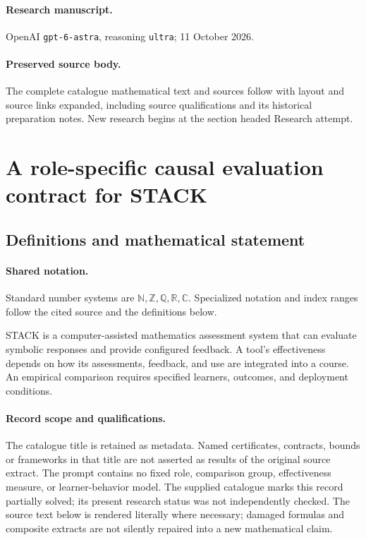 \documentclass[11pt]{article}
\begin{document}
\paragraph{Research manuscript.} OpenAI \texttt{gpt-6-astra}, reasoning \texttt{ultra}; 11 October 2026.
\paragraph{Preserved source body.} The complete catalogue mathematical text and sources follow with layout and source links expanded, including source qualifications and its historical preparation notes. New research begins at the section headed Research attempt.

\section{A role-specific causal evaluation contract for STACK}\label{statement}

\subsection{Definitions and mathematical statement}

\paragraph{Shared notation.}Standard number systems are $\mathbb N,\mathbb Z,\mathbb Q,\mathbb R,\mathbb C$. Specialized notation and index ranges follow the cited source and the definitions below.


STACK is a computer-assisted mathematics assessment system that can evaluate symbolic responses and provide configured feedback. A tool's effectiveness depends on how its assessments, feedback, and use are integrated into a course. An empirical comparison requires specified learners, outcomes, and deployment conditions.
\paragraph{Record scope and qualifications.}
The catalogue title is retained as metadata. Named certificates, contracts, bounds or frameworks in that title are not asserted as results of the original source extract.
The prompt contains no fixed role, comparison group, effectiveness measure, or learner-behavior model. The supplied catalogue marks this record partially solved; its present research status was not independently checked.
The source text below is rendered literally where necessary; damaged formulas and composite extracts are not silently repaired into a new mathematical claim.
\end{document}
